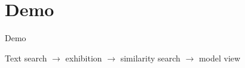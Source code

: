 \section{Demo}
\begin{frame}[c,plain]
\centering
\Huge Demo

\vspace{0.65cm}
\large
Text search $\rightarrow$ exhibition $\rightarrow$ similarity search $\rightarrow$ model view

\end{frame}
